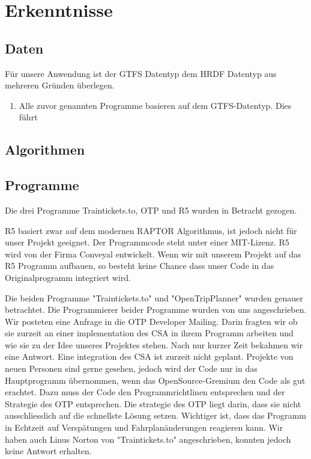 \section[Erkenntnisse]{Erkenntnisse}
\label{sec:erkenntnisse}

\subsection{Daten}
\label{sec:erkenntnisseDaten}
Für unsere Anwendung ist der GTFS Datentyp dem HRDF Datentyp aus mehreren Gründen überlegen.
\begin{enumerate}
	\item Alle zuvor genannten Programme basieren auf dem GTFS-Datentyp. Dies führt
\end{enumerate}



\subsection{Algorithmen}
\label{sec:erkenntnisseAlgorithmen}



\subsection{Programme}
\label{sec:erkenntnisseProgramme}
Die drei Programme Traintickets.to, OTP und R5 wurden in Betracht gezogen. 

R5 basiert zwar auf dem modernen RAPTOR Algorithmus, ist jedoch nicht für unser Projekt geeignet. Der Programmcode steht unter einer MIT-Lizenz. R5 wird von der Firma Conveyal entwickelt. Wenn wir mit unserem Projekt auf das R5 Programm aufbauen, so besteht keine Chance dass unser Code in das Originalprogramm integriert wird.

Die beiden Programme "Traintickets.to" und "OpenTripPlanner" wurden genauer betrachtet. Die Programmierer beider Programme wurden von uns angeschrieben. Wir posteten eine Anfrage in die OTP Developer Mailing. Darin fragten wir ob sie zurzeit an einer implementation des CSA in ihrem Programm arbeiten und wie sie zu der Idee unseres Projektes stehen. Nach nur kurzer Zeit bekahmen wir eine Antwort. Eine integration des CSA ist zurzeit nicht geplant. Projekte von neuen Personen sind gerne gesehen, jedoch wird der Code nur in das Hauptprogramm übernommen, wenn  das OpenSource-Gremium den Code als gut erachtet. Dazu muss der Code den Programmrichtlinen entsprechen und der Strategie des OTP entsprechen. Die strategie des OTP liegt darin, dass sie nicht ausschliesslich auf die schnellste Lösung setzen. Wichtiger ist, dass das Programm in Echtzeit auf Verspätungen und Fahrplanänderungen reagieren kann. Wir haben auch Linus Norton von "Traintickets.to" angeschrieben, konnten jedoch keine Antwort erhalten.